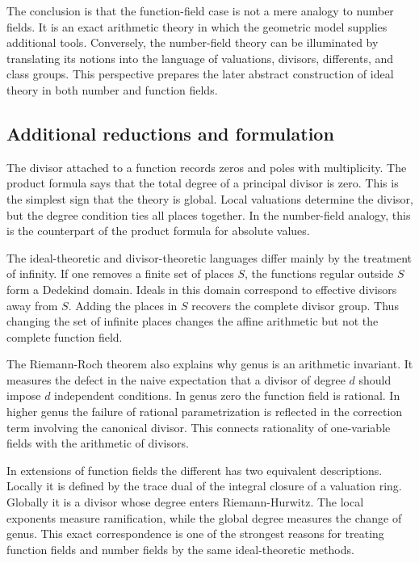 \documentclass[12pt]{article}
\begin{document}
The conclusion is that the function-field case is not a mere analogy to number fields. It is an
exact arithmetic theory in which the geometric model supplies additional tools. Conversely, the
number-field theory can be illuminated by translating its notions into the language of valuations,
divisors, differents, and class groups. This perspective prepares the later abstract construction of
ideal theory in both number and function fields.


\subsection{Additional reductions and formulation}

The divisor attached to a function records zeros and poles with multiplicity. The product formula
says that the total degree of a principal divisor is zero. This is the simplest sign that the theory
is global. Local valuations determine the divisor, but the degree condition ties all places
together. In the number-field analogy, this is the counterpart of the product formula for absolute
values.

The ideal-theoretic and divisor-theoretic languages differ mainly by the treatment of infinity. If
one removes a finite set of places \(S\), the functions regular outside \(S\) form a Dedekind
domain. Ideals in this domain correspond to effective divisors away from \(S\). Adding the places in
\(S\) recovers the complete divisor group. Thus changing the set of infinite places changes the
affine arithmetic but not the complete function field.

The Riemann-Roch theorem also explains why genus is an arithmetic invariant. It measures the defect
in the naive expectation that a divisor of degree \(d\) should impose \(d\) independent conditions.
In genus zero the function field is rational. In higher genus the failure of rational
parametrization is reflected in the correction term involving the canonical divisor. This connects
rationality of one-variable fields with the arithmetic of divisors.

In extensions of function fields the different has two equivalent descriptions. Locally it is
defined by the trace dual of the integral closure of a valuation ring. Globally it is a divisor
whose degree enters Riemann-Hurwitz. The local exponents measure ramification, while the global
degree measures the change of genus. This exact correspondence is one of the strongest reasons for
treating function fields and number fields by the same ideal-theoretic methods.
\end{document}

